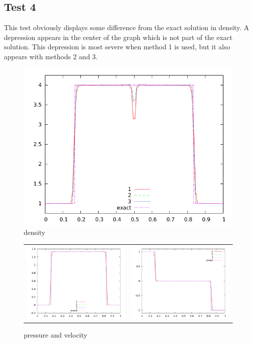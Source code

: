 \documentclass[10pt,preprint]{aastex}
\begin{document}
\clearpage

\subsection{Test 4}

This test obviously displays some difference from the exact solution in density. A depression appears in the center of the graph which is not part of the exact solution. This depression is most severe when method 1 is used, but it also appears with methods 2 and 3. 

\begin{figure}[h]
  \begin{center}
     \includegraphics[width=.78\textwidth]{den_T4.png}	
  \end{center}
  \caption{density}
\end{figure}

\begin{figure}
  \begin{center}
	\begin{tabular}{cc}
      \includegraphics[width=.425\textwidth]{prs_T4.png} &
	  \includegraphics[width=.425\textwidth]{vel_T4.png}
	\end{tabular}
  \end{center}
  \caption{pressure and velocity}
\end{figure}
\end{document}
